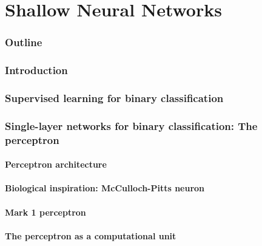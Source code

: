 \renewcommand{\thispart}{2 }
\renewcommand{\thispartname}{Shallow Neural Networks}

\part{\thispartname}



\section{Outline}


\section{Introduction}


\section{Supervised learning for binary classification}


\section{Single-layer networks for binary classification: The perceptron}
\subsection{Perceptron architecture}

\subsection{Biological inspiration: McCulloch-Pitts neuron}

\subsection{Mark 1 perceptron}

\subsection{The perceptron as a computational unit}


